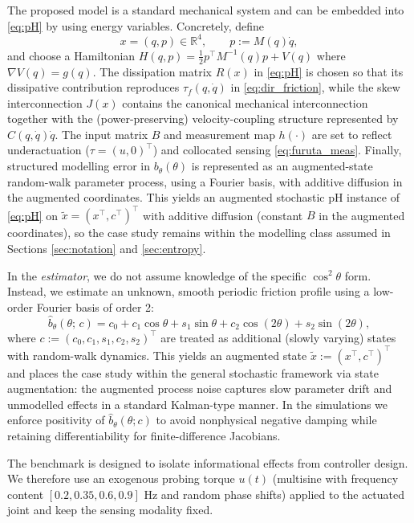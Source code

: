\documentclass[final,5p,times,twocolumn]{elsarticle}
\begin{document}
The proposed model is a standard mechanical system and can be embedded into \eqref{eq:pH} by using energy variables. Concretely, define
\begin{equation}
	x = (q,p) \in \mathbb{R}^{4},\qquad p := M(q)\dot q,
	\label{eq:furuta_energy_state}
\end{equation}
and choose a Hamiltonian $H(q,p)=\tfrac12 p^\top M^{-1}(q)p + V(q)$ where $\nabla V(q)=g(q)$.
The dissipation matrix $R(x)$ in \eqref{eq:pH} is chosen so that its dissipative contribution reproduces $\tau_f(q,\dot q)$ in \eqref{eq:dir_friction}, while the skew interconnection $J(x)$ contains the canonical mechanical interconnection together with the (power-preserving) velocity-coupling structure represented by $C(q,\dot q)\dot q$. The input matrix $B$ and measurement map $h(\cdot)$ are set to reflect underactuation ($\tau=(u,0)^\top$) and collocated sensing \eqref{eq:furuta_meas}.
Finally, structured modelling error in $b_\theta(\theta)$ is represented as an augmented-state random-walk parameter process, using a Fourier basis, with additive diffusion in the augmented coordinates. This yields an augmented stochastic pH instance of \eqref{eq:pH} on $\tilde x=(x^\top,c^\top)^\top$ with additive diffusion (constant $B$ in the augmented coordinates), so the case study remains within the modelling class assumed in Sections \ref{sec:notation} and \ref{sec:entropy}.

In the \emph{estimator}, we do not assume knowledge of the specific $\cos^2\theta$ form. Instead, we estimate an unknown, smooth periodic friction profile using a low-order Fourier basis of order 2:
\begin{equation}
	\hat{b}_\theta(\theta;\,c) = c_0 + c_1\cos\theta + s_1\sin\theta + c_2\cos(2\theta) + s_2\sin(2\theta),
	\label{eq:fourier_friction}
\end{equation}
where $c := (c_0,c_1,s_1,c_2,s_2)^\top$ are treated as additional (slowly varying) states with random-walk dynamics. This yields an augmented state $\tilde{x}:=(x^\top,c^\top)^\top$ and places the case study within the general stochastic framework via state augmentation: the augmented process noise captures slow parameter drift and unmodelled effects in a standard Kalman-type manner. In the simulations we enforce positivity of $\hat b_\theta(\theta;c)$ to avoid nonphysical negative damping while retaining differentiability for finite-difference Jacobians.

The benchmark is designed to isolate informational effects from controller design. We therefore use an exogenous probing torque $u(t)$ (multisine with frequency content $[0.2, 0.35, 0.6, 0.9]$ Hz and random phase shifts) applied to the actuated joint and keep the sensing modality fixed. 
\end{document}

